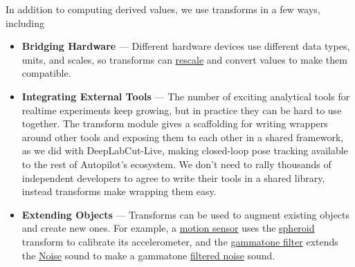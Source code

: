 In addition to computing derived values, we use transforms in a few ways, including

\begin{itemize}
\item \textbf{Bridging Hardware} --- Different hardware devices use different data types, units, and scales, so transforms can \href{https://docs.auto-pi-lot.com/en/latest/transform/units.html\#autopilot.transform.units.Rescale}{rescale} and convert values to make them compatible.
\item \textbf{Integrating External Tools} --- The number of exciting analytical tools for realtime experiments keep growing, but in practice they can be hard to use together. The transform module gives a scaffolding for writing wrappers around other tools and exposing them to each other in a shared framework, as we did with DeepLabCut-Live\citep{kaneRealtimeLowlatencyClosedloop2020a}, making closed-loop pose tracking available to the rest of Autopilot's ecosystem. We don't need to rally thousands of independent developers to agree to write their tools in a shared library, instead transforms make wrapping them easy.
\item \textbf{Extending Objects} --- Transforms can be used to augment existing objects and create new ones. For example, a \href{https://docs.auto-pi-lot.com/en/latest/hardware/i2c.html#autopilot.hardware.i2c.I2C_9DOF}{motion sensor} uses the \href{https://docs.auto-pi-lot.com/en/latest/transform/geometry.html\#autopilot.transform.geometry.Spheroid}{spheroid} transform to calibrate its accelerometer, and the \href{https://docs.auto-pi-lot.com/en/latest/transform/timeseries.html\#autopilot.transform.timeseries.Gammatone}{gammatone filter} extends the \href{https://docs.auto-pi-lot.com/en/latest/stim/sound/sounds.html\#autopilot.stim.sound.sounds.Noise}{Noise} sound to make a gammatone \href{https://docs.auto-pi-lot.com/en/latest/stim/sound/sounds.html\#autopilot.stim.sound.sounds.Gammatone}{filtered noise} sound.
\end{itemize}

